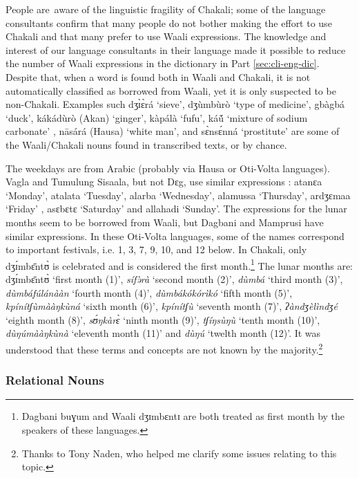 \begin{exe}
\begin{exe}
\begin{exe}
{\begin{exe}
\begin{exe}
\begin{exe}
\begin{exe}
\begin{exe}
\begin{exe}
People are aware of the linguistic fragility of Chakali; some of the
language
consultants confirm that many people do not bother making  the effort to use
Chakali and that many
prefer to use Waali expressions.  The knowledge and interest of our
language consultants in their language made  it possible  to reduce the number
of
Waali
expressions in the dictionary in Part \ref{sec:cli-eng-dic}.  Despite 
that,
when a word is found both in
Waali and Chakali, it is not automatically classified as borrowed from Waali,
yet it is only suspected to be non-Chakali.  Examples such
{\sls dʒɪ̀ɛ̀rá} `sieve', {\sls dʒùmbùrò} `type of medicine', {\sls gbàgbá}
`duck', {\sls kákádùrò} (Akan)  `ginger', {\sls kàpálà} `fufu', {\sls 
káṹ}  `mixture
of sodium carbonate' , {\sls nāsárá}  (Hausa) `white man', and  {\sls 
sɛ̀nsɛ́nná}
`prostitute' are some of the Waali/Chakali nouns  found in transcribed texts, or
by chance. 

The weekdays are from Arabic (probably via Hausa or Oti-Volta languages).
Vagla and
Tumulung Sisaala,  but  not Dɛg, use similar expressions \citep[60]{Nade96}: 
{\sls atanɛa} `Monday', {\sls atalata} `Tuesday', {\sls alarba} `Wednesday',   
{\sls alamussa} `Thursday',  {\sls ardʒɛmaa} `Friday' , {\sls asɛbɛtɛ} 
`Saturday'   and
{\sls allahadi} `Sunday'.  The expressions for the lunar months seem to be
borrowed from Waali, but Dagbani and Mamprusi have similar expressions. In
these
Oti-Volta languages, some of the names  correspond to important festivals, i.e.
1, 3, 7, 9, 10, and 12 below. In Chakali, only {\sls dʒɪ́mbɛ̄ntʊ̀} is celebrated
and  is considered the first month.\footnote{Dagbani {\sls buɣum} and Waali 
{\sls  dʒɪmbɛntɪ} are both treated as first month by the speakers of these
languages.} The lunar months are: {\sls dʒɪ́mbɛ̄ntʊ̀} `first month
(1)', {\it sífə̀rà}  `second month (2)', {\it dùmbá} `third month (3)', 
{\it dùmbáfúlánààn} `fourth month (4)',  {\it dùmbákókórìkó} `fifth 
month
(5)', {\it kpínítʃùmààŋkùná} `sixth month (6)', {\it kpínítʃù} 
`seventh
month (7)', {\it ʔàndʒèlìndʒé} `eighth month (8)', {\it sʊ́ŋkàrɛ̀} `ninth
month (9)', {\it tʃíŋsùŋù} `tenth month (10)', {\it dùŋúmààŋkùnà}
`eleventh month (11)' and {\it dùŋú} `twelth month (12)'.  It was understood
that
these terms and concepts are not known by the majority.\footnote{Thanks to Tony
Naden, who helped me clarify some issues relating to this topic.} 




\subsubsection{Relational Nouns}
\label{sec:SPA-relnoun}


\end{exe}
\end{exe}
\end{exe}
\end{exe}
\end{exe}
\end{exe}}
\end{exe}
\end{exe}
\end{exe}
